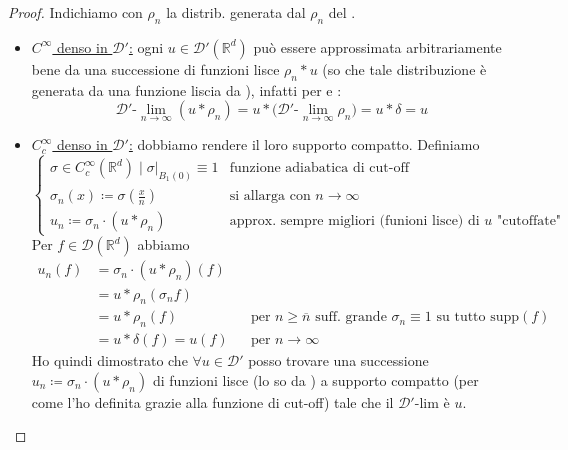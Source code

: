 \documentclass[a4paper,10pt]{article}
\theoremstyle{definition}
\newcommand{\re}{\mathbb{R}} %
\newcommand{\supp}{\text{supp}} %
\newcommand{\llim}[2]{#2\text{-}\lim_{#1\to\infty}} %
\theoremstyle{indentdefinition}
\theoremstyle{indenttheorem}
\theoremstyle{myremark}
\theoremstyle{indentgeneral}
\begin{document}
\begin{proof}
    Indichiamo con $\rho_n$ la distrib. generata dal $\rho_n$ del . 
    \begin{itemize}
        \item \underline{$C^\infty$ denso in $\mathcal{D}'$:} ogni $u\in\mathcal{D}'(\re^d)$ può essere approssimata arbitrariamente bene da una successione di funzioni lisce $\rho_n*u$ (so che tale distribuzione è generata da una funzione liscia da ), infatti per  e :
        $$\llim{n}{\mathcal{D}'}(u*\rho_n)=u*\bigg(\llim{n}{\mathcal{D}'}\rho_n\bigg)=u*\delta=u$$
         \item \underline{$C_c^\infty$ denso in $\mathcal{D}'$:} dobbiamo rendere il loro supporto compatto. Definiamo
         $$\begin{cases}
             \sigma\in C_c^\infty(\re^d)\mid  \sigma|_{B_1(0)}\equiv 1 & \text{funzione adiabatica di cut-off}\\
             \sigma_n(x)\coloneqq \sigma \left(\frac{x}{n}\right)&\text{si allarga con }n\to \infty\\
             u_n\coloneqq\sigma_n\cdot(u*\rho_n) & \text{approx. sempre migliori (funioni lisce) di $u$ "cutoffate"}
         \end{cases}$$
         Per $f\in \mathcal{D}(\re^d)$ abbiamo
         \begin{align*}
             u_n(f)&=\sigma_n\cdot(u*\rho_n)(f)\\
             &=u*\rho_n(\sigma_nf)\\
             &=u*\rho_n(f)&& \text{per $n\ge \overline{n}$ suff. grande $\sigma_n\equiv 1$ su tutto $\supp(f)$}\\
             &=u*\delta(f)=u(f)&& \text{per }n\to\infty
         \end{align*}
         Ho quindi dimostrato che $\forall u\in \mathcal{D}'$ posso trovare una successione $u_n\coloneqq\sigma_n\cdot(u*\rho_n)$ di funzioni lisce (lo so da ) a supporto compatto (per come l'ho definita grazie alla funzione di cut-off) tale che il $\mathcal{D}'$-lim è $u$. 
    \end{itemize}
\end{proof}
\end{document}

